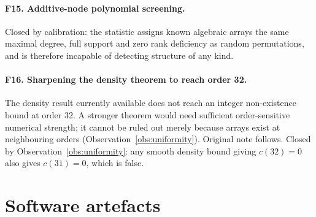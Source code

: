 \documentclass[11pt,a4paper]{article}
\theoremstyle{definition}
\begin{document}
\paragraph{F15. Additive-node polynomial screening.} Closed by calibration: the
statistic assigns known algebraic arrays the same maximal degree, full support and
zero rank deficiency as random permutations, and is therefore incapable of
detecting structure of any kind.

\paragraph{F16. Sharpening the density theorem to reach order 32.} The density
result currently available does not reach an integer non-existence bound at order
32. A stronger theorem would need sufficient order-sensitive numerical strength;
it cannot be ruled out merely because arrays exist at neighbouring orders
(Observation~\ref{obs:uniformity}). Original note follows. Closed by
Observation~\ref{obs:uniformity}: any smooth density bound giving $c(32)=0$ also
gives $c(31)=0$, which is false.

\section{Software artefacts}
\label{sec:artefacts}
\end{document}

